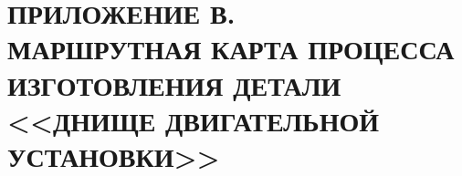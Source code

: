 \chapter{ПРИЛОЖЕНИЕ В. \\ МАРШРУТНАЯ КАРТА ПРОЦЕССА ИЗГОТОВЛЕНИЯ  ДЕТАЛИ \\ <<ДНИЩЕ ДВИГАТЕЛЬНОЙ УСТАНОВКИ>>}
\label{chapter:appendix_techno}
